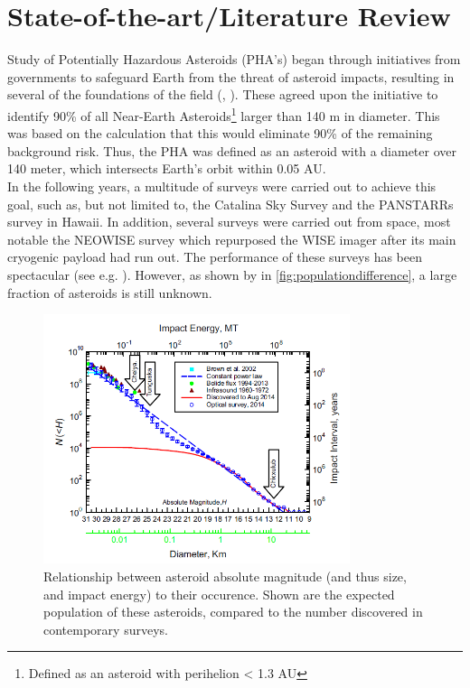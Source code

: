 \documentclass[12pt, english, NoHyper]{AE4010-template}
\begin{document}
\section{State-of-the-art/Literature Review}
Study of Potentially Hazardous Asteroids (PHA's) began through initiatives from governments to safeguard Earth from the threat of asteroid impacts, resulting in several of the foundations of the field (\cite{InitialTaskforce}, \cite{DefendingPlanetEarth}). These agreed upon the initiative to identify 90\% of all Near-Earth Asteroids\footnote{Defined as an asteroid with perihelion < 1.3 AU} larger than 140 m in diameter. This was based on the calculation that this would eliminate 90\% of the remaining background risk. Thus, the PHA was defined as an asteroid with a diameter over 140 meter, which intersects Earth's orbit within 0.05 AU. \\

In the following years, a multitude of surveys were carried out to achieve this goal, such as, but not limited to, the Catalina Sky Survey and the PANSTARRs survey in Hawaii. In addition, several surveys were carried out from space, most notable the NEOWISE survey which repurposed the WISE imager after its main cryogenic payload had run out. The performance of these surveys has been spectacular (see e.g. \cite{NEOWISEFlex}). However, as shown by \cite{PopulationHarris} in \autoref{fig:populationdifference}, a large fraction of asteroids is still unknown.\\

\begin{figure}[thb]
 \centering
 \includegraphics[width=0.8\textwidth]{figures/populationdifference.png}
 \caption{Relationship between asteroid absolute magnitude (and thus size, and impact energy) to their occurence. Shown are the expected population of these asteroids, compared to the number discovered in contemporary surveys.}
 \label{fig:populationdifference}
\end{figure}
\end{document}
